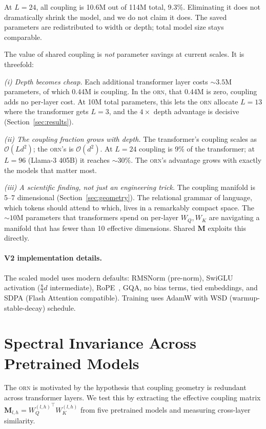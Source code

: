 \documentclass[10pt,twocolumn]{article}
\newcommand{\M}{\mathbf{M}}
\newcommand{\bigO}{\mathcal{O}}
\newcommand{\orn}{\textsc{orn}}
\begin{document}
At $L{=}24$, all coupling is 10.6M out of 114M total, 9.3\%.
Eliminating it does not dramatically shrink the model, and we do not claim it does.
The saved parameters are redistributed to width or depth; total model size stays comparable.

The value of shared coupling is \emph{not} parameter savings at current scales.
It is threefold:

\emph{(i) Depth becomes cheap.}
Each additional transformer layer costs ${\sim}3.5$M parameters, of which 0.44M is coupling.
In the \orn{}, that 0.44M is zero, coupling adds no per-layer cost.
At 10M total parameters, this lets the \orn{} allocate $L{=}13$ where the transformer gets $L{=}3$, and the $4\times$ depth advantage is decisive (Section~\ref{sec:results}).

\emph{(ii) The coupling fraction grows with depth.}
The transformer's coupling scales as $\bigO(Ld^2)$; the \orn{}'s is $\bigO(d^2)$.
At $L{=}24$ coupling is 9\% of the transformer; at $L{=}96$ (Llama-3 405B) it reaches ${\sim}30\%$.
The \orn{}'s advantage grows with exactly the models that matter most.

\emph{(iii) A scientific finding, not just an engineering trick.}
The coupling manifold is 5--7 dimensional (Section~\ref{sec:geometry}).
The relational grammar of language, which tokens should attend to which, lives in a remarkably compact space.
The ${\sim}10$M parameters that transformers spend on per-layer $W_Q, W_K$ are navigating a manifold that has fewer than 10 effective dimensions.
Shared $\M$ exploits this directly.

\paragraph{V2 implementation details.}
The scaled model uses modern defaults: RMSNorm (pre-norm), SwiGLU activation ($\frac{8}{3}d$ intermediate), RoPE~\cite{su2024rope}, GQA, no bias terms, tied embeddings, and SDPA (Flash Attention compatible).
Training uses AdamW with WSD (warmup-stable-decay) schedule.

\section{Spectral Invariance Across Pretrained Models}
\label{sec:invariance}

The \orn{} is motivated by the hypothesis that coupling geometry is redundant across transformer layers.
We test this by extracting the effective coupling matrix $\M_{l,h} = {W_Q^{(l,h)}}^\top W_K^{(l,h)}$ from five pretrained models and measuring cross-layer similarity.
\end{document}
